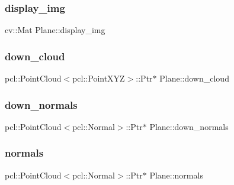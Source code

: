 \subsubsection{\texorpdfstring{display\+\_\+img}{display\_img}}
{\footnotesize\ttfamily cv\+::\+Mat Plane\+::display\+\_\+img\hspace{0.3cm}{\ttfamily [private]}}

\hypertarget{class_plane_ae4198f097fe1b58f10068f7bc0962c8c}{}\label{class_plane_ae4198f097fe1b58f10068f7bc0962c8c} 
\subsubsection{\texorpdfstring{down\+\_\+cloud}{down\_cloud}}
{\footnotesize\ttfamily pcl\+::\+Point\+Cloud$<$pcl\+::\+Point\+X\+YZ$>$\+::Ptr$\ast$ Plane\+::down\+\_\+cloud\hspace{0.3cm}{\ttfamily [private]}}

\hypertarget{class_plane_aa76fc2b11042a6681c4573159d4fb384}{}\label{class_plane_aa76fc2b11042a6681c4573159d4fb384} 
\subsubsection{\texorpdfstring{down\+\_\+normals}{down\_normals}}
{\footnotesize\ttfamily pcl\+::\+Point\+Cloud$<$pcl\+::\+Normal$>$\+::Ptr$\ast$ Plane\+::down\+\_\+normals\hspace{0.3cm}{\ttfamily [private]}}

\hypertarget{class_plane_a28e30d6c24eaa6c4e1d57ea8c1a2d924}{}\label{class_plane_a28e30d6c24eaa6c4e1d57ea8c1a2d924} 
\subsubsection{\texorpdfstring{normals}{normals}}
{\footnotesize\ttfamily pcl\+::\+Point\+Cloud$<$pcl\+::\+Normal$>$\+::Ptr$\ast$ Plane\+::normals\hspace{0.3cm}{\ttfamily [private]}}

\hypertarget{class_plane_abc9e342c010c172faf22b345f68f25bd}{}\label{class_plane_abc9e342c010c172faf22b345f68f25bd} 
